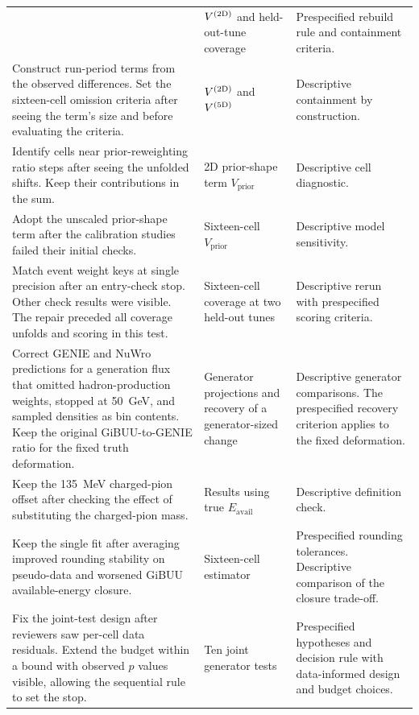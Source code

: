 \begin{xltabular}{\textwidth}{@{}>{\raggedright\arraybackslash{}\hsize}X
                               >{\raggedright\arraybackslash{}\hsize}X >{\raggedright\arraybackslash{}\hsize}X@{}}
  & $V^{(2\mathrm{D})}$ and held-out-tune coverage & Prespecified rebuild rule and
  containment criteria. \\
  \addlinespace[2pt] Construct run-period terms from the observed differences. Set the sixteen-cell omission criteria after seeing the term's size and before evaluating the criteria.
  & $V^{(2\mathrm{D})}$ and $V^{(5\mathrm{D})}$ & Descriptive containment by construction. \\
  \addlinespace[2pt] Identify cells near prior-reweighting ratio steps after seeing the unfolded shifts. Keep their contributions in the sum.
  & 2D prior-shape term $V_{\mathrm{prior}}$ & Descriptive cell diagnostic. \\
  \addlinespace[2pt] Adopt the unscaled prior-shape term after the calibration studies failed their initial checks.
  & Sixteen-cell $V_{\mathrm{prior}}$ & Descriptive model sensitivity. \\
  \addlinespace[2pt] Match event weight keys at single precision after an entry-check stop. Other check results were visible. The repair preceded all coverage unfolds and scoring in this test.
  & Sixteen-cell coverage at two held-out tunes & Descriptive rerun with
  prespecified scoring criteria. \\
  \addlinespace[2pt] Correct GENIE and NuWro predictions for a generation flux that omitted hadron-production weights, stopped at \SI{50}{GeV}, and sampled densities as bin contents. Keep the original GiBUU-to-GENIE ratio for the fixed truth deformation.
  & Generator projections and recovery of a generator-sized change &
  Descriptive generator comparisons. The prespecified recovery criterion applies to the fixed deformation. \\
  \addlinespace[2pt] Keep the \SI{135}{MeV} charged-pion offset after checking the effect of substituting the charged-pion mass.
  & Results using true $E_{\mathrm{avail}}$ & Descriptive definition check. \\
  \addlinespace[2pt] Keep the single fit after averaging improved rounding stability on pseudo-data and worsened GiBUU available-energy closure.
  & Sixteen-cell estimator & Prespecified rounding tolerances.
  Descriptive comparison of the closure trade-off. \\
  \addlinespace[2pt] Fix the joint-test design after reviewers saw per-cell data residuals. Extend the budget within a bound with observed $p$ values visible, allowing the sequential rule to set the stop.
  & Ten joint generator tests & Prespecified hypotheses and decision rule
  with data-informed design and budget choices. \\

\end{xltabular}
